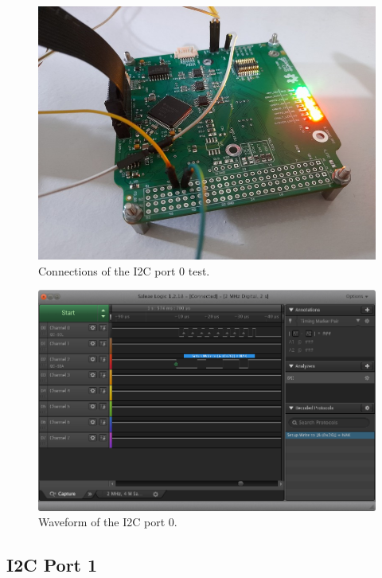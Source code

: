 \begin{figure}[!ht]
    \begin{center}
        \includegraphics[width=0.7\columnwidth]{figures/v05/test-i2c-0.jpg}
        \caption{Connections of the I2C port 0 test.}
        \label{fig:test-i2c-0}
    \end{center}
\end{figure}

\begin{figure}[!ht]
    \begin{center}
        \includegraphics[width=\columnwidth]{figures/v05/waveform-i2c-0.png}
        \caption{Waveform of the I2C port 0.}
        \label{fig:waveform-i2c-0}
    \end{center}
\end{figure}

\subsection{I2C Port 1}


